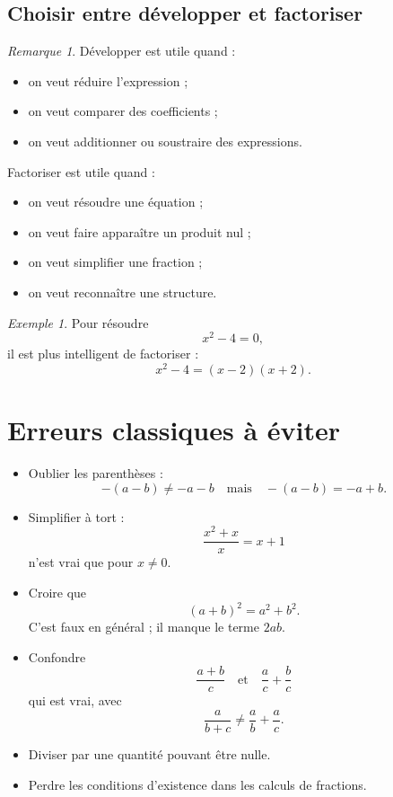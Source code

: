 \documentclass[11pt,a4paper]{article}
\theoremstyle{remark}
\newtheorem{remarque}[definition]{Remarque}
\newtheorem{exemple}[definition]{Exemple}
\begin{document}
\subsection{Choisir entre développer et factoriser}

\begin{remarque}
Développer est utile quand :
\begin{itemize}
    \item on veut réduire l’expression ;
    \item on veut comparer des coefficients ;
    \item on veut additionner ou soustraire des expressions.
\end{itemize}

Factoriser est utile quand :
\begin{itemize}
    \item on veut résoudre une équation ;
    \item on veut faire apparaître un produit nul ;
    \item on veut simplifier une fraction ;
    \item on veut reconnaître une structure.
\end{itemize}
\end{remarque}

\begin{exemple}
Pour résoudre
\[
x^2-4=0,
\]
il est plus intelligent de factoriser :
\[
x^2-4=(x-2)(x+2).
\]
\end{exemple}

\section{Erreurs classiques à éviter}

\begin{itemize}
    \item Oublier les parenthèses :
    \[
    -(a-b)\neq -a-b \quad \text{mais} \quad -(a-b)=-a+b.
    \]

    \item Simplifier à tort :
    \[
    \frac{x^2+x}{x}=x+1
    \]
    n’est vrai que pour \(x\neq 0\).

    \item Croire que
    \[
    (a+b)^2=a^2+b^2.
    \]
    C’est faux en général ; il manque le terme \(2ab\).

    \item Confondre
    \[
    \frac{a+b}{c}
    \quad \text{et} \quad
    \frac{a}{c}+\frac{b}{c}
    \]
    qui est vrai,
    avec
    \[
    \frac{a}{b+c}
    \neq
    \frac{a}{b}+\frac{a}{c}.
    \]

    \item Diviser par une quantité pouvant être nulle.

    \item Perdre les conditions d’existence dans les calculs de fractions.
\end{itemize}
\end{document}
